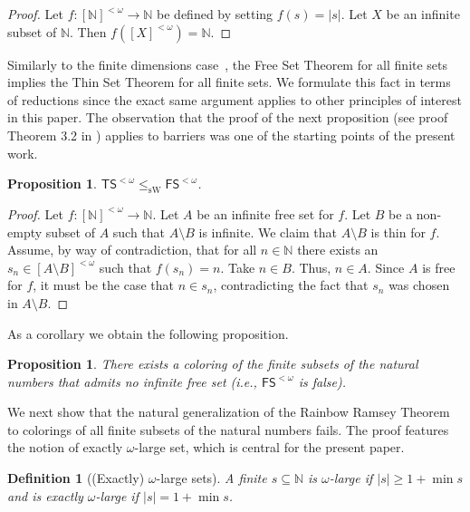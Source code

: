 \documentclass{article}
\newcommand{\FS}[0]{\mathsf{FS}}
\newcommand{\TS}[0]{\mathsf{TS}}
\newcommand{\NN}[0]{\mathbb{N}}
\newcommand{\sW}{\mathrm{sW}}
\numberwithin{theorem}{section}
\newtheorem{proposition}[theorem]{Proposition}
\newtheorem{definition}[theorem]{Definition}
\begin{document}
\begin{proof}
Let $f:[\NN]^{<\omega} \to \NN$ be defined by setting $f(s) = |s|$. 
Let $X$ be an infinite subset of $\NN$. Then $f([X]^{<\omega})= \NN$.
\end{proof}


Similarly to the finite dimensions case~\cite{Cholak_Giusto_Hirst_Jockusch_2005}, the Free Set Theorem for all finite sets implies the Thin Set Theorem for all finite sets. 
We formulate this fact in terms of reductions since the exact same argument applies to other principles of interest in this paper. The observation that the proof of the next proposition (see proof Theorem 3.2 in \cite{Cholak_Giusto_Hirst_Jockusch_2005}) applies to barriers was one of the starting points of the present work. 

\begin{proposition}\label{prop:ts_red_fs}
$\TS^{<\omega}\leq_{\sW} \FS^{<\omega} $.
\end{proposition}

\begin{proof}
Let $f:[\NN]^{<\omega}\to \NN$. Let $A$ be an infinite free set for $f$. 
Let $B$ be a non-empty subset of $A$ such that $A\setminus B$ is infinite. 
We claim that $A\setminus B$ is thin for $f$. Assume, by way of contradiction, that for all $n \in \NN$ there exists an $s_n\in [A\setminus B]^{<\omega}$ such that $f(s_n) = n$. Take $n\in B$. Thus, $n \in A$. Since $A$ is free for $f$, it must be the case that $n \in s_n$, contradicting the fact that $s_n$ was chosen 
in $A\setminus B$. 
\end{proof}

As a corollary we obtain the following proposition. 

\begin{proposition}
There exists a coloring of the finite subsets of the natural numbers that admits no infinite free set (i.e., $\FS^{<\omega}$ is false). 
\end{proposition}

We next show that the natural generalization of the Rainbow Ramsey Theorem to colorings of all finite subsets of the natural numbers fails.
The proof features the notion of exactly $\omega$-large set, which is central for the present paper. 

\begin{definition}[(Exactly) $\omega$-large sets] 
A finite $s\subseteq \NN$ is $\omega$-large if $|s| \geq 1+\min s$ and is exactly $\omega$-large if $|s| = 1+\min s$.
\end{definition}
\end{document}
